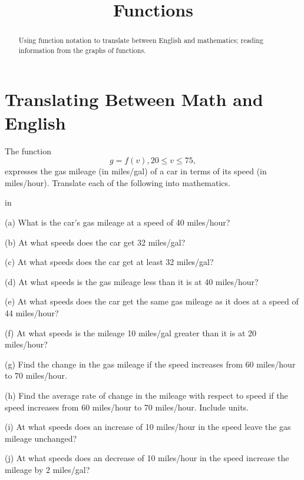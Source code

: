 \documentclass{ximera}
\title{Functions}
\newcommand{\pskip}{\vskip 0.1 in}
\begin{document}
\begin{abstract}
Using function notation to translate between English and mathematics; reading information from the graphs of functions.
\end{abstract}
\maketitle

\section{Translating Between Math and English}

\begin{example}  \label{ExFun1}

The function
\[
   g = f(v) , 20 \leq v \leq 75 ,
\]
expresses the gas mileage (in miles/gal) of a car in terms of its speed (in miles/hour). Translate each of the following into mathematics.

\pskip


\noindent (a) What is the car's gas mileage at a speed of 40 miles/hour?

\noindent (b) At what speeds does the car get 32 miles/gal?

\noindent (c) At what speeds does the car get at least 32 miles/gal?

\noindent (d) At what speeds is the gas mileage less than it is at 40 miles/hour?

\noindent (e) At what speeds does the car get the same gas mileage as it does at a speed of 44 miles/hour?

\noindent (f) At what speeds is the mileage 10 miles/gal greater than it is at 20 miles/hour?

\noindent (g) Find the change in the gas mileage if the speed increases from 60 miles/hour to 70 miles/hour.

\noindent (h) Find the average rate of change in the mileage with respect to speed if the speed increases from 60 miles/hour to 70 miles/hour. Include units.

\noindent (i) At what speeds does an increase of 10 miles/hour in the speed leave the gas mileage unchanged?

\noindent (j) At what speeds does an decrease of 10 miles/hour in the speed increase the mileage by 2 miles/gal?

\end{example}
\end{document}
